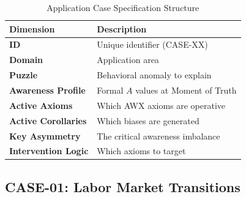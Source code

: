 \begin{table}[htbp]
\centering
\caption{Application Case Specification Structure}
\label{tab:case-structure}
\begin{tabular}{lp{10cm}}
\toprule
\textbf{Dimension} & \textbf{Description} \\
\midrule
\textbf{ID} & Unique identifier (CASE-XX) \\
\textbf{Domain} & Application area \\
\textbf{Puzzle} & Behavioral anomaly to explain \\
\textbf{Awareness Profile} & Formal $A$ values at Moment of Truth \\
\textbf{Active Axioms} & Which AWX axioms are operative \\
\textbf{Active Corollaries} & Which biases are generated \\
\textbf{Key Asymmetry} & The critical awareness imbalance \\
\textbf{Intervention Logic} & Which axioms to target \\
\bottomrule
\end{tabular}
\end{table}


\subsection{CASE-01: Labor Market Transitions}

